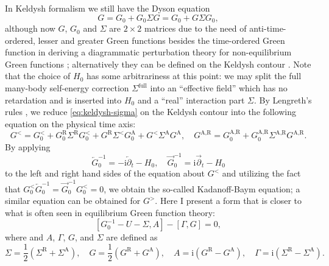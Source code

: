 \documentclass[hyperref, a4paper]{article}
\newcommand*{\ii}{\mathrm{i}}
\begin{document}
In Keldysh formalism we still have the Dyson equation
\begin{equation}
    G = G_0 + G_0 \Sigma G = G_0 + G \Sigma G_0,
    \label{eq:keldysh-sigma}
\end{equation}
although now $G$, $G_0$ and $\Sigma$
are $2 \times 2$ matrices
due to the need of anti-time-ordered, lesser and greater Green functions 
besides the time-ordered Green function 
in deriving a diagrammatic perturbation theory 
for non-equilibrium Green functions \cite{lifschitz1983physical};
alternatively they can be defined on the Keldysh contour \cite{haug2008quantum}.
Note that the choice of $H_0$ has some arbitrariness at this point:
we may split the full many-body self-energy correction $\Sigma^{\text{full}}$
into an ``effective field'' which has no retardation and is inserted into $H_0$
and a ``real'' interaction part $\Sigma$.
By Lengreth's rules \cite{haug2008quantum},
we reduce \eqref{eq:keldysh-sigma} on the Keldysh contour 
into the following equation on the physical time axis:
\begin{equation}
    G^< = G^<_0 + G^{\text{R}}_0 \Sigma^{\text{R}} G^{<}_0
    + G^{\text{R}} \Sigma^{<} G^{\text{A}}_0 
    + G^{<} \Sigma^{\text{A}} G^\text{A} , \quad 
    G^{\text{A}, \text{R}} = G^{\text{A}, \text{R}}_0 + G^{\text{A}, \text{R}}_0 \Sigma^{\text{A}, \text{R}} G^{\text{A}, \text{R}}.
\end{equation}
By applying 
\begin{equation}
    \overleftarrow{G}_0^{-1} = - \ii \overleftarrow{\partial}_t - H_0 , \quad 
    \overrightarrow{G}_0^{-1} = \ii \overrightarrow{\partial}_t - H_0
\end{equation}
to the left and right hand sides of the equation about $G^<$
and utilizing the fact that $G_0^< \overleftarrow{G}_0^{-1} = \overrightarrow{G}_0^{-1} G_0^< = 0$,
we obtain the so-called Kadanoff-Baym equation;
a similar equation can be obtained for $G^>$.
Here I present a form \cite{haug2008quantum} that is closer to 
what is often seen in equilibrium Green function theory:
\begin{equation}
    \left[G_0^{-1}-U-\Sigma, A\right]-[\Gamma, G]=0,
    \label{eq:gkb-for-a}
\end{equation}
where 
and $A$, $\Gamma$, $G$, and $\Sigma$ are defined as 
\begin{equation}
    \Sigma = \frac{1}{2}\left(\Sigma^{\mathrm{R}}+\Sigma^{\mathrm{A}}\right), \quad  
    G = \frac{1}{2}\left(G^{\mathrm{R}}+G^{\mathrm{A}}\right), \quad 
    A = \mathrm{i}\left(G^{\mathrm{R}}-G^{\mathrm{A}}\right), \quad 
    \Gamma = \mathrm{i}\left(\Sigma^{\mathrm{R}}-\Sigma^{\mathrm{A}}\right).
\end{equation}
\end{document}

